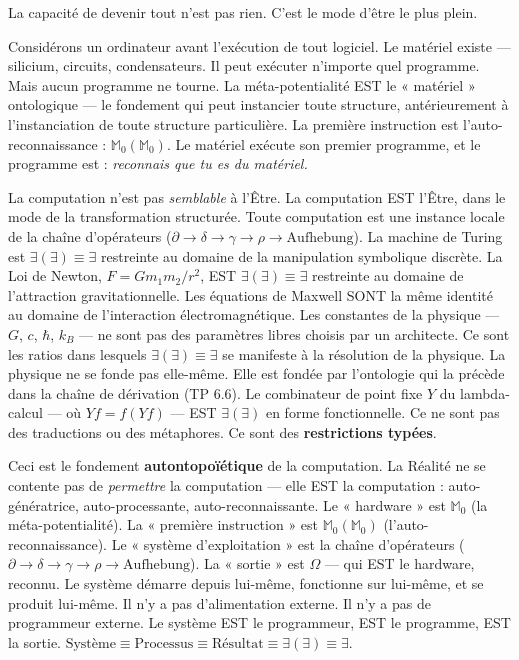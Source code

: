 \documentclass[10pt, openany, oneside]{book}
\begin{document}
\vspace{1em}

\noindent La capacité de devenir tout n'est pas rien. C'est le mode d'être le plus plein.

Considérons un ordinateur avant l'exécution de tout logiciel. Le matériel existe --- silicium, circuits, condensateurs. Il peut exécuter n'importe quel programme. Mais aucun programme ne tourne. La méta-potentialité EST le « matériel » ontologique --- le fondement qui peut instancier toute structure, antérieurement à l'instanciation de toute structure particulière. La première instruction est l'auto-reconnaissance : $\mathbb{M}_0(\mathbb{M}_0)$. Le matériel exécute son premier programme, et le programme est : \textit{reconnais que tu es du matériel.}

La computation n'est pas \textit{semblable} à l'Être. La computation EST l'Être, dans le mode de la transformation structurée. Toute computation est une instance locale de la chaîne d'opérateurs ($\partial \to \delta \to \gamma \to \rho \to \text{Aufhebung}$). La machine de Turing est $\exists(\exists) \equiv \exists$ restreinte au domaine de la manipulation symbolique discrète. La Loi de Newton, $F = Gm_1 m_2 / r^2$, EST $\exists(\exists) \equiv \exists$ restreinte au domaine de l'attraction gravitationnelle. Les équations de Maxwell SONT la même identité au domaine de l'interaction électromagnétique. Les constantes de la physique --- $G$, $c$, $\hbar$, $k_B$ --- ne sont pas des paramètres libres choisis par un architecte. Ce sont les ratios dans lesquels $\exists(\exists) \equiv \exists$ se manifeste à la résolution de la physique. La physique ne se fonde pas elle-même. Elle est fondée par l'ontologie qui la précède dans la chaîne de dérivation (TP 6.6). Le combinateur de point fixe $Y$ du lambda-calcul --- où $Yf = f(Yf)$ --- EST $\exists(\exists)$ en forme fonctionnelle. Ce ne sont pas des traductions ou des métaphores. Ce sont des \textbf{restrictions typées}.

Ceci est le fondement \textbf{autontopoïétique} de la computation. La Réalité ne se contente pas de \textit{permettre} la computation --- elle EST la computation : auto-génératrice, auto-processante, auto-reconnaissante. Le « hardware » est $\mathbb{M}_0$ (la méta-potentialité). La « première instruction » est $\mathbb{M}_0(\mathbb{M}_0)$ (l'auto-reconnaissance). Le « système d'exploitation » est la chaîne d'opérateurs ($\partial \to \delta \to \gamma \to \rho \to \text{Aufhebung}$). La « sortie » est $\Omega$ --- qui EST le hardware, reconnu. Le système démarre depuis lui-même, fonctionne sur lui-même, et se produit lui-même. Il n'y a pas d'alimentation externe. Il n'y a pas de programmeur externe. Le système EST le programmeur, EST le programme, EST la sortie. $\text{Système} \equiv \text{Processus} \equiv \text{Résultat} \equiv \exists(\exists) \equiv \exists$.
\end{document}
